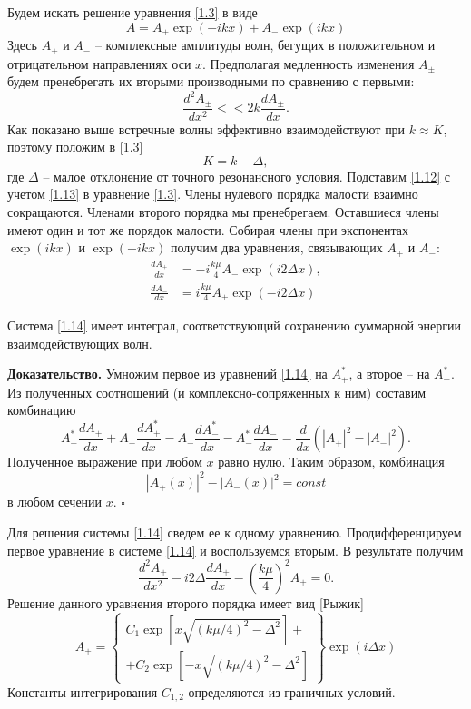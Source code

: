 Будем искать решение уравнения \eqref{1.3} в виде
\begin{equation}\label{1.12}
A=A_+\exp(-ikx)+A_-\exp(ikx)
\end{equation}
Здесь $A_+$ и $A_-$ -- комплексные амплитуды волн, бегущих в положительном и отрицательном направлениях оси $x$. Предполагая медленность изменения $A_\pm$ будем пренебрегать их вторыми производными по сравнению с первыми:
$$
\frac{d^2A_\pm}{dx^2} << 2k\frac{dA_\pm}{dx}.
$$
Как показано выше встречные волны эффективно взаимодействуют при $k\approx K$, поэтому положим в \eqref{1.3}
\begin{equation}\label{1.13}
K=k-\Delta,
\end{equation}
где $\Delta$ -- малое отклонение от точного резонансного условия. Подставим \eqref{1.12} с учетом \eqref{1.13} в уравнение \eqref{1.3}. Члены нулевого порядка малости взаимно сокращаются. Членами второго порядка мы пренебрегаем. Оставшиеся члены имеют один и тот же порядок малости. Собирая члены при экспонентах $\exp(ikx)$ и $\exp(-ikx)$ получим два уравнения, связывающих $A_+$ и $A_-$:
\begin{equation}\label{1.14}
\begin{split}
\frac{dA_+}{dx}&=-i\frac{k\mu}{4}A_-\exp(i2\Delta x),\\
\frac{dA_-}{dx}&=i\frac{k\mu}{4}A_+\exp(-i2\Delta x)
\end{split}
\end{equation}

\begin{utv}
Система \eqref{1.14} имеет интеграл, соответствующий сохранению суммарной энергии взаимодействующих волн.
\end{utv}
\textbf{Доказательство.}
Умножим первое из уравнений \eqref{1.14} на $A^\ast_+$, а второе -- на $A^\ast_-$. Из полученных соотношений (и комплексно-сопряженных к ним) составим комбинацию
$$
A^\ast_+\frac{dA_+}{dx}+A_+\frac{dA^\ast_+}{dx}-A_-\frac{dA^\ast_-}{dx}-A^\ast_-\frac{dA_-}{dx}=\frac{d}{dx}(|A_+|^2-|A_-|^2).
$$
Полученное выражение при любом $x$ равно нулю. Таким образом, комбинация
\begin{equation}\label{1.15}
\left|A_+(x)\right|^2-\left|A_-(x)\right|^2=const
\end{equation}
в любом сечении $x$.
\newline$\square$

Для решения системы \eqref{1.14} сведем ее к одному уравнению. Продифференцируем первое уравнение в системе \eqref{1.14} и воспользуемся вторым. В результате получим
\begin{equation}\label{1.16}
\frac{d^2A_+}{dx^2}-i2\Delta\frac{dA_+}{dx}-\left(\frac{k\mu}{4}\right)^2A_+=0.
\end{equation}
Решение данного уравнения второго порядка имеет вид [Рыжик]
\begin{equation}\label{1.17}
A_+=\left\lbrace
\begin{aligned}
C_1\exp\left[x\sqrt{(k\mu /4)^2-\Delta ^2}\right]+\\
+C_2\exp\left[-x\sqrt{(k\mu /4)^2-\Delta ^2}\right]
\end{aligned}
\right\rbrace\exp(i\Delta x)
\end{equation}
Константы интегрирования $C_{1,2}$ определяются из граничных условий.

